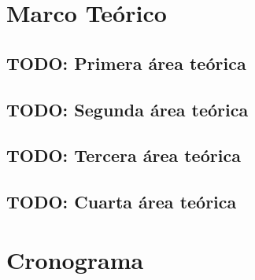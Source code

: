 \documentclass{univalle-perfil}
\begin{document}
\section{Marco Teórico}


\subsection{TODO: Primera área teórica}


\subsection{TODO: Segunda área teórica}


\subsection{TODO: Tercera área teórica}


\subsection{TODO: Cuarta área teórica}


\section{Cronograma}



\end{document}
